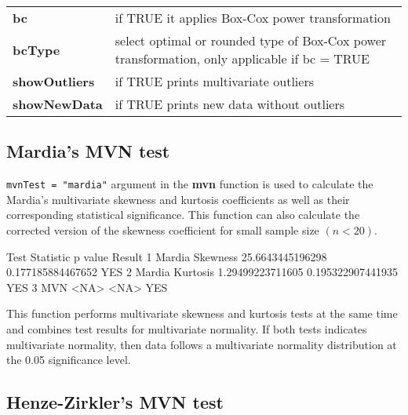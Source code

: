 \documentclass[11pt]{article}
\begin{document}
\begin{Schunk}
\begin{Soutput}
\begin{table}[H]
\begin{table}[H]
\begin{tabular}{>{\bfseries\leavevmode\color{black}}l>{\raggedright\arraybackslash}p{30em}}
bc & if TRUE it applies Box-Cox power transformation\\
\addlinespace
bcType & select optimal or rounded type of Box-Cox power transformation, only applicable if bc = TRUE\\
showOutliers & if TRUE prints multivariate outliers\\
showNewData & if TRUE prints new data without outliers\\
\bottomrule
\end{tabular}
\end{table}
\end{table}
\end{Soutput}
\end{Schunk}


\subsection{Mardia's MVN test} \label{subsec:mardiaRtexttt}

\texttt{mvnTest = "mardia"} argument in the \textbf{mvn} function is used to calculate the Mardia's multivariate skewness and kurtosis coef\mbox{}f\mbox{}icients as well as their corresponding statistical significance. This function can also calculate the corrected version of the skewness coef\mbox{}f\mbox{}icient for small sample size $(n<20)$.

\begin{Schunk}
\begin{Soutput}
             Test        Statistic           p value Result
1 Mardia Skewness 25.6643445196298 0.177185884467652    YES
2 Mardia Kurtosis 1.29499223711605 0.195322907441935    YES
3             MVN             <NA>              <NA>    YES
\end{Soutput}
\end{Schunk}

This function performs multivariate skewness and kurtosis tests at the same time and combines test results for multivariate normality. If both tests indicates multivariate normality, then data follows a multivariate normality distribution at the 0.05 significance level.


\subsection{Henze-Zirkler's MVN test} \label{subsec:hzRtexttt}
\end{document}

